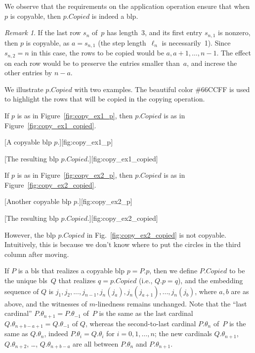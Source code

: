 \documentclass{article}
\theoremstyle{definition}
\theoremstyle{remark}
\newtheorem{remark}[lemma]{Remark}
\begin{document}
We observe that the requirements on the application operation ensure that when $p$ is copyable, then $p.Copied$ is indeed a blp. 

\begin{remark} \label{rmk:applying_a_row_of_length_3}
  If the last row $s_n$ of~$p$ has length~3, and its first entry $s_{n,1}$ is nonzero, then $p$ is copyable, as $a = s_{n,1}$ (the step length~$\ell_n$ is necessarily~1). Since $s_{n,2} = n$ in this case, the rows to be copied would be $a,a+1,\dots, n-1$. The effect on each row would be to preserve the entries smaller than~$a$, and increse the other entries by $n-a$. 
\end{remark}



\medskip

We illustrate $p.Copied$ with two examples. The beautiful color \textcolor{TianyiBlue}{\#66CCFF} is used to highlight the rows that will be copied in the copying operation.

If $p$ is as in Figure~\ref{fig:copy_ex1_p}, then $p.Copied$ is as in Figure~\ref{fig:copy_ex1_copied}.

[A copyable blp $p$.][fig:copy_ex1_p]

[The resulting blp $p.Copied$.][fig:copy_ex1_copied]

If $p$ is as in Figure~\ref{fig:copy_ex2_p}, then $p.Copied$ is as in Figure~\ref{fig:copy_ex2_copied}.

[Another copyable blp $p$.][fig:copy_ex2_p]

[The resulting blp $p.Copied$.][fig:copy_ex2_copied]

However, the blp $p.Copied$ in Fig.~\ref{fig:copy_ex2_copied} is not copyable. Intuitively, this is because we don't know where to put the circles in the third column after moving.

\medskip

If $P$ is a bls that realizes a copyable blp $p = P.p$, then we define  $P.Copied$ to be the unique bls~$Q$ that realizes $q=p.Copied$ (i.e., $Q.p=q$), and the embedding sequence of $Q$ is $j_1,j_2,...,j_{n-1},j_n(j_a),j_n(j_{a+1}),...,j_n(j_{b})$, where $a,b$ are as above, and the witnesses of $m$-linedness remains unchanged. Note that the ``last cardinal'' $P.\theta_{n+1} = P.\theta_{-1}$ of~$P$ is the same as the last cardinal $Q.\theta_{n+b-a+1} = Q.\theta_{-1}$ of $Q$, whereas the second-to-last cardinal $P.\theta_n$ of~$P$ is the same as $Q.\theta_n$, indeed $P.\theta_i = Q.\theta_i$ for $i=0,1,\dots, n$;  the new cardinals $Q.\theta_{n+1}$, $Q.\theta_{n+2}$, \dots, $Q.\theta_{n+b-a}$ are all between $P.\theta_n$ and $P.\theta_{n+1}$. 
\end{document}
